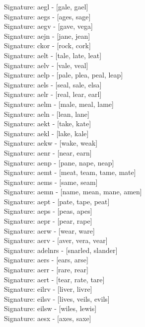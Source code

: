 Signature: {aegl} - [gale, gael] \\
Signature: {aegs} - [ages, sage] \\
Signature: {aegv} - [gave, vega] \\
Signature: {aejn} - [jane, jean] \\
Signature: {ckor} - [rock, cork] \\
Signature: {aelt} - [tale, late, leat] \\
Signature: {aelv} - [vale, veal] \\
Signature: {aelp} - [pale, plea, peal, leap] \\
Signature: {aels} - [seal, sale, elsa] \\
Signature: {aelr} - [real, lear, earl] \\
Signature: {aelm} - [male, meal, lame] \\
Signature: {aeln} - [lean, lane] \\
Signature: {aekt} - [take, kate] \\
Signature: {aekl} - [lake, kale] \\
Signature: {aekw} - [wake, weak] \\
Signature: {aenr} - [near, earn] \\
Signature: {aenp} - [pane, nape, neap] \\
Signature: {aemt} - [meat, team, tame, mate] \\
Signature: {aems} - [same, seam] \\
Signature: {aemn} - [name, mean, mane, amen] \\
Signature: {aept} - [pate, tape, peat] \\
Signature: {aeps} - [peas, apes] \\
Signature: {aepr} - [pear, rape] \\
Signature: {aerw} - [wear, ware] \\
Signature: {aerv} - [aver, vera, vear] \\
Signature: {adelnrs} - [snarled, slander] \\
Signature: {aers} - [ears, arse] \\
Signature: {aerr} - [rare, rear] \\
Signature: {aert} - [tear, rate, tare] \\
Signature: {eilrv} - [liver, livre] \\
Signature: {eilsv} - [lives, veils, evils] \\
Signature: {eilsw} - [wiles, lewis] \\
Signature: {aesx} - [axes, saxe] \\
